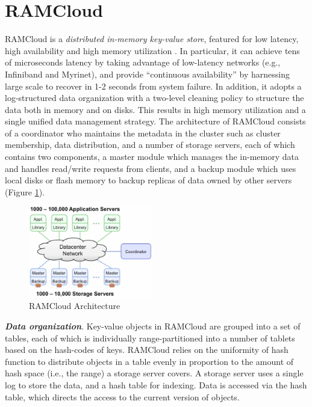 \documentclass[twocolumn]{article}
\begin{document}
\section{RAMCloud}
RAMCloud is a \textit{distributed in-memory key-value store}, featured for low latency, high availability and high memory utilization \cite{Ousterhout:2015}. In particular, it can achieve tens of microseconds latency
by taking advantage of low-latency networks (e.g., Infiniband and
Myrinet), and provide ``continuous availability'' by harnessing large
scale to recover in 1-2 seconds from system failure. In addition, it
adopts a log-structured data organization with a two-level cleaning
policy to structure the data both in memory and on disks. This results
in high memory utilization and a single unified data management
strategy. The architecture of RAMCloud consists of a coordinator who
maintains the metadata in the cluster such as cluster membership, data
distribution, and a number of storage servers, each of which contains
two components, a master module which manages the in-memory data and
handles read/write requests from clients, and a backup module which uses
local disks or flash memory to backup replicas of data owned by other
servers (Figure \ref{fig:ramcloud_architecture}).

\begin{figure}[htb]
        \centering
        \includegraphics[width=0.48\textwidth]{architecture_ramcloud.png}
        \caption{RAMCloud Architecture}
        \label{fig:ramcloud_architecture}
\end{figure}

\noindent
\textbf{\emph{Data organization}}. Key-value objects in RAMCloud are grouped into
a set of tables, each of which is individually range-partitioned into a
number of tablets based on the hash-codes of keys. RAMCloud relies on
the uniformity of hash function to distribute objects in a table evenly
in proportion to the amount of hash space (i.e., the range) a storage
server covers. A storage server uses a single log to store the data, and
a hash table for indexing. Data is accessed via the hash table, which
directs the access to the current version of objects.
\end{document}
